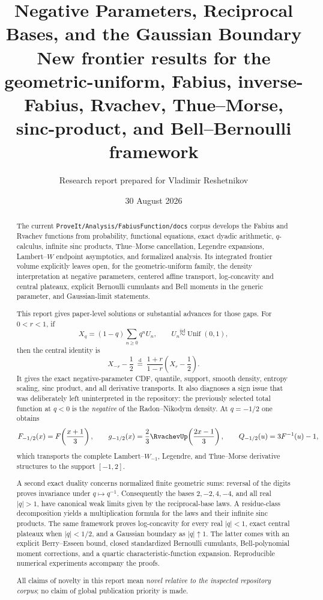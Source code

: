 \documentclass[11pt]{article}
\title{\textbf{Negative Parameters, Reciprocal Bases, and the Gaussian Boundary}\\[2mm]
\large New frontier results for the geometric-uniform, Fabius, inverse-Fabius, Rvachev, Thue--Morse, sinc-product, and Bell--Bernoulli framework}
\author{Research report prepared for Vladimir Reshetnikov}
\date{30 August 2026}
\theoremstyle{definition}
\newcommand{\doteqL}{\mathrel{\stackrel{\mathrm d}=}}
\begin{document}
\maketitle

\begin{abstract}
The current \texttt{ProveIt/Analysis/FabiusFunction/docs} corpus develops the Fabius and
Rvachev functions from probability, functional equations, exact dyadic arithmetic,
$q$-calculus, infinite sinc products, Thue--Morse cancellation, Legendre expansions,
Lambert--$W$ endpoint asymptotics, and formalized analysis.  Its integrated frontier
volume explicitly leaves open, for the geometric-uniform family, the density
interpretation at negative parameters, centered affine transport, log-concavity and
central plateaux, explicit Bernoulli cumulants and Bell moments in the generic
parameter, and Gaussian-limit statements.

This report gives paper-level solutions or substantial advances for those gaps.  For
\(0<r<1\), if
\[
 X_q=(1-q)\sum_{n\ge0}q^nU_n,
 \qquad U_n\stackrel{\mathrm{iid}}\sim\operatorname{Unif}(0,1),
\]
then the central identity is
\[
 X_{-r}-\frac12\ \doteqL\
 \frac{1+r}{1-r}\left(X_r-\frac12\right).
\]
It gives the exact negative-parameter CDF, quantile, support, smooth density, entropy
scaling, sinc product, and all derivative transports.  It also diagnoses a sign issue
that was deliberately left uninterpreted in the repository: the previously selected
total function at \(q<0\) is the \emph{negative} of the Radon--Nikodym density.  At
\(q=-1/2\) one obtains
\[
 F_{-1/2}(x)=F\!\left(\frac{x+1}{3}\right),\qquad
 g_{-1/2}(x)=\frac23\RvachevUp\!\left(\frac{2x-1}{3}\right),\qquad
 Q_{-1/2}(u)=3F^{-1}(u)-1,
\]
which transports the complete Lambert--\(W_{-1}\), Legendre, and Thue--Morse derivative
structures to the support \([-1,2]\).

A second exact duality concerns normalized finite geometric sums: reversal of the
digits proves invariance under \(q\mapsto q^{-1}\).  Consequently the bases
\(2,-2,4,-4\), and all real \(\lvert q\rvert>1\), have canonical weak limits given by
the reciprocal-base laws.  A residue-class decomposition yields a multiplication
formula for the laws and their infinite sinc products.  The same framework proves
log-concavity for every real \(\lvert q\rvert<1\), exact central plateaux when
\(\lvert q\rvert<1/2\), and a Gaussian boundary as \(\lvert q\rvert\uparrow1\).  The
latter comes with an explicit Berry--Esseen bound, closed standardized Bernoulli
cumulants, Bell-polynomial moment corrections, and a quartic characteristic-function
expansion.  Reproducible numerical experiments accompany the proofs.

All claims of novelty in this report mean \emph{novel relative to the inspected
repository corpus}; no claim of global publication priority is made.
\end{abstract}
\end{document}
